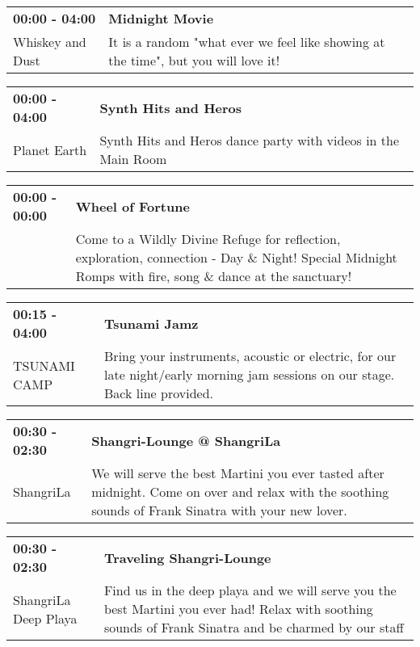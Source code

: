 \begin{tabular}{ p{1in} p{2.2in} }
    \textbf{00:00 - 04:00} & \textbf{Midnight Movie} \\
    Whiskey and Dust \newline  & It is a random "what ever we feel like showing at the time", but you will love it! \\
    \hline 
\end{tabular}
    
\begin{tabular}{ p{1in} p{2.2in} }
    \textbf{00:00 - 04:00} & \textbf{Synth Hits and Heros} \\
    Planet Earth \newline  & Synth Hits and Heros dance party with videos in the Main Room \\
    \hline 
\end{tabular}
    
\begin{tabular}{ p{1in} p{2.2in} }
    \textbf{00:00 - 00:00} & \textbf{Wheel of Fortune} \\
    ~ \newline  & Come to a Wildly Divine Refuge for reflection, exploration, connection - Day \& Night! Special Midnight Romps with fire, song \& dance at the sanctuary! \\
    \hline 
\end{tabular}
    
\begin{tabular}{ p{1in} p{2.2in} }
    \textbf{00:15 - 04:00} & \textbf{Tsunami Jamz} \\
    TSUNAMI CAMP \newline  & Bring your instruments, acoustic or electric, for our late night/early morning jam sessions on our stage.  Back line provided. \\
    \hline 
\end{tabular}
    
\begin{tabular}{ p{1in} p{2.2in} }
    \textbf{00:30 - 02:30} & \textbf{Shangri-Lounge @ ShangriLa} \\
    ShangriLa \newline  & We will serve the best Martini you ever tasted after midnight. Come on over and relax with the soothing sounds of Frank Sinatra with your new lover. \\
    \hline 
\end{tabular}
    
\begin{tabular}{ p{1in} p{2.2in} }
    \textbf{00:30 - 02:30} & \textbf{Traveling Shangri-Lounge} \\
    ShangriLa \newline Deep Playa & Find us in the deep playa and we will serve you the best Martini you ever had! Relax with soothing sounds of Frank Sinatra and be charmed by our staff \\
    \hline 
\end{tabular}
    
